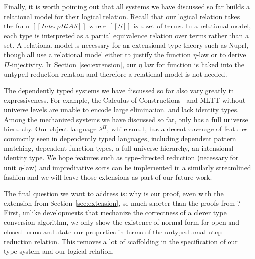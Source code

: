 \documentclass[acmsmall,screen=true,
\ifpublic review=false\else,review=true\fi
  ,anonymous=\ifanonymous true\else false\fi]{acmart}
\newcommand{\lang}{$\lambda^H$\xspace}
\newcommand{\scw}[1]{}
\begin{document}
Finally, it is worth pointing out that all systems we have discussed
so far builds a relational model for their logical relation. Recall
that our logical relation takes the form $[[InterpR i A S]]$ where
$[[S]]$ is a set of terms. In a relational model, each type is
interpreted as a partial equivalence relation over terms rather than a
set. A relational model is necessary for an extensional type theory
such as Nuprl, though \citet{nbeincoq,decagda,martin-lof-a-la-coq} all
use a relational model either to justify the function $\eta$-law or to
derive $\Pi$-injectivity. In Section~\ref{sec:extension}, our $\eta$
law for function is baked into the untyped reduction
relation and therefore a relational model is not needed.
\scw{would it be difficult to extend your proof to be a PER?}

The dependently typed systems we have discussed so far also vary
greatly in expressiveness. For example, the Calculus of
Constructions~\citep{CoC} and MLTT without universe levels are unable
to encode large elimination. \citet{decagda} and \citet{nbeincoq} lack
identity types. %
Among
the mechanized systems we have discussed so far, only
\citet{anand2014towards} has a full universe hierarchy.
Our object language \lang{}, while small, has a decent coverage of
features commonly seen in dependently typed languages, including
dependent pattern matching, dependent function types, a full universe
hierarchy, an intensional identity type. We hope features such as
type-directed reduction (necessary for unit $\eta$-law) and
impredicative sorts can be implemented in a similarly streamlined
fashion and we will leave those extensions as part of our future work.

\scw{should this be a new subsection?}
The final question we want to address is: why is our proof,
even with the extension from Section~\ref{sec:extension}, so much
shorter than the proofs from \citet{decagda, nbeincoq,
  martin-lof-a-la-coq}?
First, unlike developments that mechanize the correctness of a clever
type conversion algorithm, we only show the existence of
normal form for open and closed terms and state our properties in
terms of the untyped small-step reduction relation. This removes a lot
of scaffolding in the specification of our type system and our logical
relation.
\end{document}
